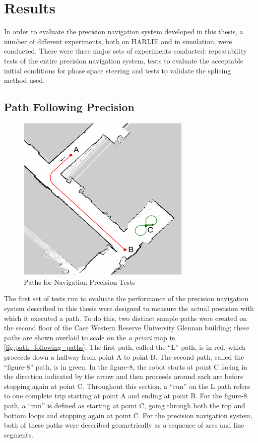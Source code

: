 \section{Results}\label{sec:results}

In order to evaluate the precision navigation system developed in this thesis, a number of different experiments, both on HARLIE and in simulation, were conducted. There were three major sets of experiments conducted: repeatability tests of the entire precision navigation system, tests to evaluate the acceptable initial conditions for phase space steering and tests to validate the splicing method used.

\subsection{Path Following Precision}\label{subsec:path_following_precision}

\begin{figure}
\centering
\includegraphics[width=0.75\textwidth]{images/path_following_paths}
\caption{Paths for Navigation Precision Tests \label{fig:path_following_paths}}
\end{figure}

The first set of tests run to evaluate the performance of the precision navigation system described in this thesis were designed to measure the actual precision with which it executed a path. To do this, two distinct sample paths were created on the second floor of the Case Western Reserve University Glennan building; these paths are shown overlaid to scale on the \emph{a priori} map in \autoref{fig:path_following_paths}. The first path, called the ``L'' path, is in red, which proceeds down a hallway from point A to point B. The second path, called the ``figure-8'' path, is in green. In the figure-8, the robot starts at point C facing in the direction indicated by the arrow and then proceeds around each arc before stopping again at point C. Throughout this section, a “run” on the L path refers to one complete trip starting at point A and ending at point B. For the figure-8 path, a “run” is defined as starting at point C, going through both the top and bottom loops and stopping again at point C. For the precision navigation system, both of these paths were described geometrically as a sequence of arcs and line segments.

